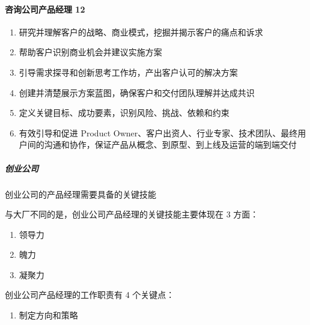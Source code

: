 \documentclass[letterpaper,11pt,english]{sphinxmanual}
\begin{document}
\paragraph{咨询公司产品经理 12\sphinxfootnotemark[58]}
\label{\detokenize{chapter_introduction/PM:id18}}%
\begin{footnotetext}[58]\sphinxAtStartFootnote
{}
%
\end{footnotetext}\ignorespaces \begin{enumerate}
%
\item {} 
研究并理解客户的战略、商业模式，挖掘并揭示客户的痛点和诉求

\item {} 
帮助客户识别商业机会并建议实施方案

\item {} 
引导需求探寻和创新思考工作坊，产出客户认可的解决方案

\item {} 
创建并清楚展示方案蓝图，确保客户和交付团队理解并达成共识

\item {} 
定义关键目标、成功要素，识别风险、挑战、依赖和约束

\item {} 
有效引导和促进 Product
Owner、客户出资人、行业专家、技术团队、最终用户间的沟通和协作，保证产品从概念、到原型、到上线及运营的端到端交付

\end{enumerate}


\subparagraph{创业公司}
\label{\detokenize{chapter_introduction/PM:id19}}
创业公司的产品经理需要具备的关键技能

与大厂不同的是，创业公司产品经理的关键技能主要体现在 3 方面：
\begin{enumerate}
%
\item {} 
领导力

\item {} 
魄力

\item {} 
凝聚力

\end{enumerate}

创业公司产品经理的工作职责有 4 个关键点：
\begin{enumerate}
%
\item {} 
制定方向和策略

\end{enumerate}
\end{document}
